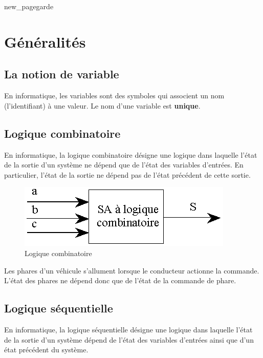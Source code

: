 \documentclass[10pt,fleqn]{article} %
\begin{document}
{new_pagegarde}

\section{Généralités}
\subsection{La notion de variable}
\begin{definition}
  En informatique, les variables sont des symboles qui associent un nom (l'identifiant) à une valeur. Le nom d'une variable est \textbf{unique}.
\end{definition}


\subsection{Logique combinatoire}

\begin{definition}
  En informatique, la logique combinatoire désigne une logique dans laquelle l'état de la sortie d'un système ne dépend que de l'état des variables d'entrées. En particulier, l'état de la sortie ne dépend pas de l'état précédent de cette sortie.
\end{definition}

\begin{figure}[h]
  \centering
  \includegraphics[width=.4\textwidth]{images/combinatoire}
  \caption{Logique combinatoire}
  \label{fig:combinatoire}
\end{figure}

\begin{exemple}
  Les phares d'un véhicule s'allument lorsque le conducteur actionne la commande. L'état des phares ne dépend donc que de l'état de la commande de phare.
\end{exemple}

\subsection{Logique séquentielle}

\begin{definition}
  En informatique, la logique séquentielle désigne une logique dans laquelle l'état de la sortie d'un système dépend de l'état des variables d'entrées ainsi que d'un état précédent du système.
\end{definition}
\end{document}
